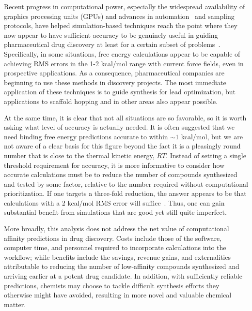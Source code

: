 \documentclass[aps,pre,twocolumn,nofootinbib,superscriptaddress,10pt, final,tightenlines]{revtex4-1}
\begin{document}
Recent progress in computational power, especially the widespread availability of graphics processing units (GPUs) and advances in automation~\cite{liu_lead_2013} and sampling protocols, have helped simulation-based techniques reach the point where they now appear to have sufficient accuracy to be genuinely useful in guiding pharmaceutical drug discovery at least for a certain subset of problems~\cite{mikulskis_large-scale_2014, homeyer_binding_2014, sherborne_preprint_2016,  schrodinger_accurate_2015, christ_binding_2016, cui_affinity_2016, verras_free_2016}.
Specifically, in some situations, free energy calculations appear to be capable of achieving RMS errors in the 1-2 kcal/mol range with current force fields, even in prospective applications.
As a consequence, pharmaceutical companies are beginning to use these methods in discovery projects. 
The most immediate application of these techniques is to guide synthesis for lead optimization, but applications to scaffold hopping and in other areas also appear possible.

At the same time, it is clear that not all situations are so favorable, so it is worth asking what level of accuracy is actually needed. 
It is often suggested that we need binding free energy predictions accurate to within $\sim 1$ kcal/mol, but we are not aware of a clear basis for this figure beyond the fact it is a pleasingly round number that is close to the thermal kinetic energy, $RT$. 
Instead of setting a single threshold requirement for accuracy, it is more informative to consider how accurate calculations must be to reduce the number of compounds synthesized and tested by some factor, relative to the number required without computational prioritization. 
If one targets a three-fold reduction, the answer appears to be that calculations with a 2 kcal/mol RMS error will suffice~\cite{shirts_free-energy_2010, mobley_perspective_2012}. 
Thus, one can gain substantial benefit from simulations that are good yet still quite imperfect.

More broadly, this analysis does not address the net value of computational affinity predictions in drug discovery.
Costs include those of the software, computer time, and personnel required to incorporate calculations into the workflow; while benefits include the savings, revenue gains, and externalities attributable to reducing the number of low-affinity compounds synthesized and arriving earlier at a potent drug candidate.
In addition, with sufficiently reliable predictions, chemists may choose to tackle difficult synthesis efforts they otherwise might have avoided, resulting in more novel and valuable chemical matter.
\end{document}
